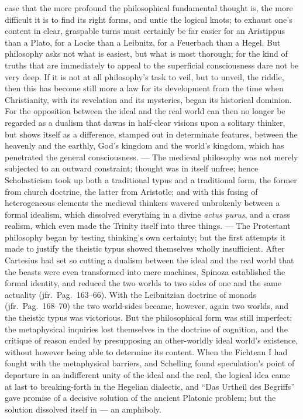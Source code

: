\documentclass[12pt]{book}
\begin{document}
case that the more profound the philosophical fundamental thought is, the
more difficult it is to find its right forms, and untie the logical knots;
to exhaust one's content in clear, graspable turns must certainly be far
easier for an Aristippus than a Plato, for a Locke than a Leibnitz, for a
Feuerbach than a Hegel. But philosophy asks not what is easiest, but what is
most thorough; for the kind of truths that are immediately to appeal to the
superficial consciousness dare not be very deep. If it is not at all
philosophy's task to veil, but to unveil, the riddle, then this has become
still more a law for its development from the time when Christianity, with
its revelation and its mysteries, began its historical dominion. For the
opposition between the ideal and the real world can then no longer be
regarded as a dualism that dawns in half-clear visions upon a solitary
thinker, but shows itself as a difference, stamped out in determinate
features, between the heavenly and the earthly, God's kingdom and the
world's kingdom, which has penetrated the general consciousness. --- The
medieval philosophy was not merely subjected to an outward constraint;
thought was in itself unfree; hence Scholasticism took up both a traditional
typus and a traditional form, the former from church doctrine, the latter
from Aristotle; and with this fusing of heterogeneous elements the medieval
thinkers wavered unbrokenly between a formal idealism, which dissolved
everything in a divine \textit{actus purus}, and a crass realism, which even
made the Trinity itself into three things. --- The Protestant philosophy
began by testing thinking's own certainty; but the first attempts it made to
justify the theistic typus showed themselves wholly insufficient. After
Cartesius had set so cutting a dualism between the ideal and the real world
that the beasts were even transformed into mere machines, Spinoza
established the formal identity, and reduced the two worlds to two sides of
one and the same actuality (jfr.\ Pag.\ 163--66). With the Leibnitzian
doctrine of monads (jfr.\ Pag.\ 168--70) the two world-sides became,
however, again two worlds, and the theistic typus was victorious. But the
philosophical form was still imperfect; the metaphysical inquiries lost
themselves in the doctrine of cognition, and the critique of reason ended by
presupposing an other-worldly ideal world's existence, without however being
able to determine its content. When the Fichtean I had fought with the
metaphysical barriers, and Schelling found speculation's point of departure
in an indifferent unity of the ideal and the real, the logical idea came at
last to breaking-forth in the Hegelian dialectic, and ``Das Urtheil des
Begriffs'' gave promise of a decisive solution of the ancient Platonic
problem; but the solution dissolved itself in --- an amphiboly.
\end{document}
